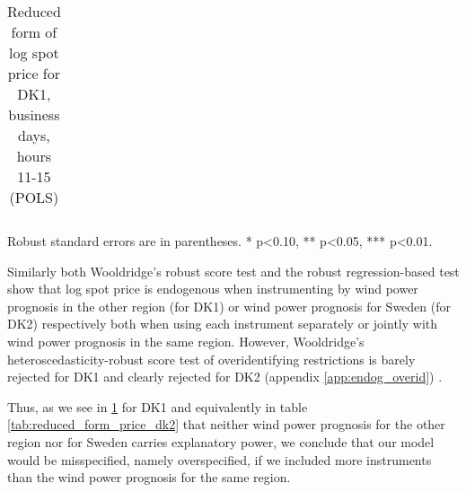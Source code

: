 \begin{table}[H]
\begin{threeparttable}
  \centering
  \caption{Reduced form of log spot price for DK1, business days, hours 11-15 (POLS)}
  \label{tab:reduced_form_price_dk1}
  \footnotesize
  \begin{tabular}{lcccc}
         
  \end{tabular}
    \begin{tablenotes}
        \item Robust standard errors are in parentheses. * p<0.10, ** p<0.05, *** p<0.01.
    \end{tablenotes}
\end{threeparttable}
\end{table}
Similarly both Wooldridge's robust score test and the robust regression-based test show that log spot price is endogenous when instrumenting by wind power prognosis in the other region (for DK1) or wind power prognosis for Sweden (for DK2) respectively both when using each instrument separately or jointly with wind power prognosis in the same region. However, Wooldridge's heteroscedasticity-robust score test of overidentifying restrictions is barely rejected for DK1 and clearly rejected for DK2 (appendix \ref{app:endog_overid}) \citep{statacorp2017stata}.
\par
Thus, as we see in \ref{tab:reduced_form_price_dk1} for DK1 and equivalently in table \ref{tab:reduced_form_price_dk2} that neither wind power prognosis for the other region nor for Sweden carries explanatory power, we conclude that our model would be misspecified, namely overspecified, if we included more instruments than the wind power prognosis for the same region.


